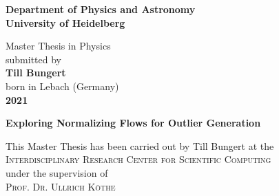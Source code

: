 \begin{titlepage}
\begin{center}
 
\Large\textbf{Department of Physics and Astronomy\\
University of Heidelberg}

\vspace{18cm}

\normalsize
Master Thesis in Physics\\
submitted by\\
\vspace{0.5cm}
\Large\textbf{Till Bungert}\\
\normalsize
\vspace{0.5cm}
born in Lebach (Germany)\\
\vspace{0.5cm}
\Large\textbf{2021}
\normalsize

\newpage

\Large\textbf{Exploring Normalizing Flows for Outlier Generation}

\vfill

\normalsize
\begin{doublespace}
This Master Thesis has been carried out by Till Bungert at the\\
\textsc{Interdisciplinary Research Center for Scientific Computing}\\
under the supervision of\\
\textsc{Prof. Dr. Ullrich Köthe}
\end{doublespace}

\end{center}

\end{titlepage}
